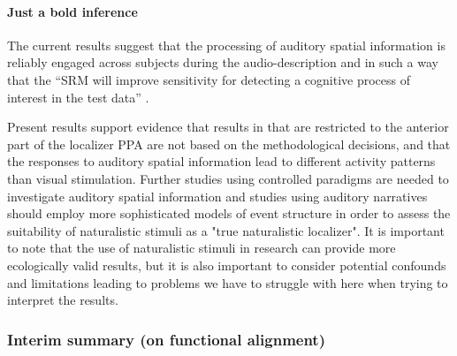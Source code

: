 \paragraph{Just a bold inference}

%
The current results suggest that the processing of auditory spatial information
is reliably engaged across subjects during the audio-description and in such a
way that the ``SRM will improve sensitivity for detecting a cognitive process of
interest in the test data'' \citep{cohen2017computational}.

%
Present results support evidence that results in \citet{haeusler2022processing}
that are restricted to the anterior part of the localizer PPA are not based on
the methodological decisions, and that the responses to auditory spatial
information lead to different activity patterns than visual stimulation.
%
Further studies using controlled paradigms are needed to investigate auditory
spatial information and studies using auditory narratives should employ more
sophisticated models of event structure in order to assess the suitability of
naturalistic stimuli as a "true naturalistic localizer".
%
It is important to note that the use of naturalistic stimuli in research can
provide more ecologically valid results, but it is also important to consider
potential confounds and limitations leading to problems we have to struggle with
here when trying to interpret the results.




\subsubsection{Interim summary (on functional alignment)}




